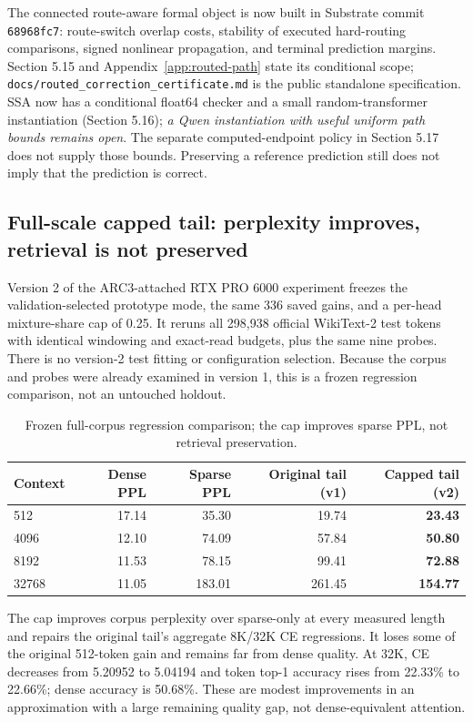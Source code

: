 \documentclass[11pt]{article}
\numberwithin{equation}{section}
\begin{document}
The connected route-aware formal object is now built in Substrate commit
\texttt{68968fc7}: route-switch overlap costs, stability of executed hard-routing comparisons, signed
nonlinear propagation, and terminal prediction margins. Section 5.15 and Appendix~\ref{app:routed-path}
state its conditional scope; \nolinkurl{docs/routed_correction_certificate.md} is the public standalone
specification. SSA now has a conditional float64 checker and a small random-transformer instantiation
(Section 5.16); \emph{a Qwen instantiation with useful uniform path bounds remains open}. The separate
computed-endpoint policy in Section 5.17 does not supply those bounds. Preserving a reference prediction
still does not imply that the prediction is correct.

\subsection{Full-scale capped tail: perplexity improves, retrieval is not preserved}

Version 2 of the ARC3-attached RTX PRO 6000 experiment freezes the validation-selected prototype mode,
the same 336 saved gains, and a per-head mixture-share cap of 0.25. It reruns all 298,938 official
WikiText-2 test tokens with identical windowing and exact-read budgets, plus the same nine probes.
There is no version-2 test fitting or configuration selection. Because the corpus and probes were already
examined in version 1, this is a frozen regression comparison, not an untouched holdout.

\begin{table}[ht]
\centering\small
\begin{tabular}{lrrrr}\toprule
Context & Dense PPL & Sparse PPL & Original tail (v1) & Capped tail (v2)\\\midrule
512 & 17.14 & 35.30 & 19.74 & \textbf{23.43}\\
4096 & 12.10 & 74.09 & 57.84 & \textbf{50.80}\\
8192 & 11.53 & 78.15 & 99.41 & \textbf{72.88}\\
32768 & 11.05 & 183.01 & 261.45 & \textbf{154.77}\\\bottomrule
\end{tabular}
\caption{Frozen full-corpus regression comparison; the cap improves sparse PPL, not retrieval preservation.}
\end{table}

The cap improves corpus perplexity over sparse-only at every measured length and repairs the original
tail's aggregate 8K/32K CE regressions. It loses some of the original 512-token gain and remains far
from dense quality. At 32K, CE decreases from 5.20952 to 5.04194 and token top-1 accuracy rises from
22.33\% to 22.66\%; dense accuracy is 50.68\%. These are modest improvements in an approximation with a
large remaining quality gap, not dense-equivalent attention.
\end{document}

